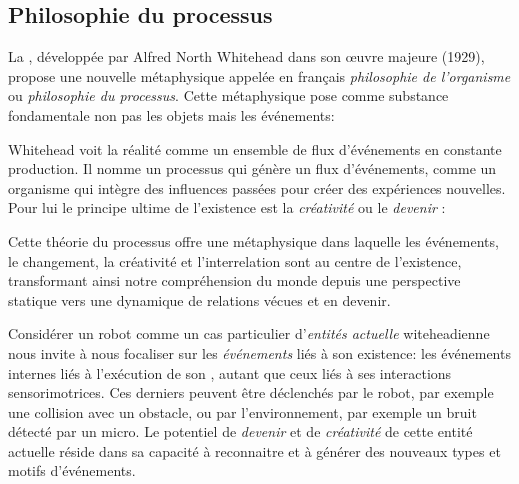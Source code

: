 \subsection{Philosophie du processus}

\noindent
La , développée par Alfred North Whitehead dans son œuvre majeure \og {} \fg (1929), propose une nouvelle métaphysique appelée en français \emph{philosophie de l'organisme} ou \emph{philosophie du processus}. 
Cette métaphysique pose comme substance fondamentale non pas les objets mais les événements:


\begin{quote}
	\cite{whitehead_process_1929}
\end{quote}

Whitehead voit la réalité comme un ensemble de flux d'événements en constante production. 
Il nomme  un processus qui génère un flux d'événements, comme un organisme qui intègre des influences passées pour créer des expériences nouvelles. 
Pour lui le principe ultime de l'existence est la \emph{créativité} ou le \emph{devenir} :  

\begin{quote}
\end{quote}

Cette théorie du processus offre une métaphysique dans laquelle les événements, le changement, la créativité et l'interrelation sont au centre de l'existence, transformant ainsi notre compréhension du monde depuis une perspective statique vers une dynamique de relations vécues et en devenir.

Considérer un robot comme un cas particulier d'\emph{entités actuelle} witeheadienne nous invite à nous focaliser sur les \emph{événements} liés à son existence: les événements internes liés à l'exécution de son , autant que ceux liés à ses interactions sensorimotrices. 
Ces derniers peuvent être déclenchés par le robot, par exemple une collision avec un obstacle, ou par l'environnement, par exemple un bruit détecté par un micro.
Le potentiel de \emph{devenir} et de \emph{créativité} de cette entité actuelle réside dans sa capacité à reconnaitre et à générer des nouveaux types et motifs d'événements.   


